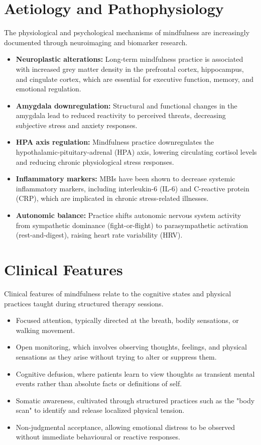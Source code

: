 \section*{Aetiology and Pathophysiology}
The physiological and psychological mechanisms of mindfulness are increasingly documented through neuroimaging and biomarker research.
\begin{itemize}
    \item \textbf{Neuroplastic alterations:} Long-term mindfulness practice is associated with increased grey matter density in the prefrontal cortex, hippocampus, and cingulate cortex, which are essential for executive function, memory, and emotional regulation.
    \item \textbf{Amygdala downregulation:} Structural and functional changes in the amygdala lead to reduced reactivity to perceived threats, decreasing subjective stress and anxiety responses.
    \item \textbf{HPA axis regulation:} Mindfulness practice downregulates the hypothalamic-pituitary-adrenal (HPA) axis, lowering circulating cortisol levels and reducing chronic physiological stress responses.
    \item \textbf{Inflammatory markers:} MBIs have been shown to decrease systemic inflammatory markers, including interleukin-6 (IL-6) and C-reactive protein (CRP), which are implicated in chronic stress-related illnesses.
    \item \textbf{Autonomic balance:} Practice shifts autonomic nervous system activity from sympathetic dominance (fight-or-flight) to parasympathetic activation (rest-and-digest), raising heart rate variability (HRV).
\end{itemize}

\section*{Clinical Features}
Clinical features of mindfulness relate to the cognitive states and physical practices taught during structured therapy sessions.
\begin{itemize}
    \item Focused attention, typically directed at the breath, bodily sensations, or walking movement.
    \item Open monitoring, which involves observing thoughts, feelings, and physical sensations as they arise without trying to alter or suppress them.
    \item Cognitive defusion, where patients learn to view thoughts as transient mental events rather than absolute facts or definitions of self.
    \item Somatic awareness, cultivated through structured practices such as the "body scan" to identify and release localized physical tension.
    \item Non-judgmental acceptance, allowing emotional distress to be observed without immediate behavioural or reactive responses.
\end{itemize}

